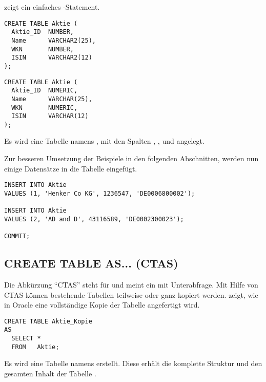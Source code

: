          zeigt ein einfaches -Statement.
        \begin{lstlisting}[language=oracle_sql,caption={Eine einfache CREATE TABLE-Anweisung in Oracle},label=sql08_02]
CREATE TABLE Aktie (
  Aktie_ID  NUMBER,
  Name      VARCHAR2(25),
  WKN       NUMBER,
  ISIN      VARCHAR2(12)
);
        \end{lstlisting}
        \begin{lstlisting}[language=ms_sql,caption={Das gleiche in MS SQL Server},label=sql08_03]
CREATE TABLE Aktie (
  Aktie_ID  NUMERIC,
  Name      VARCHAR(25),
  WKN       NUMERIC,
  ISIN      VARCHAR(12)
);
        \end{lstlisting}
        Es wird eine Tabelle namens , mit den Spalten , ,  und  angelegt.

        Zur besseren Umsetzung der Beispiele in den folgenden Abschnitten, werden nun einige Datens\"atze in die Tabelle  eingef\"ugt.
        \begin{lstlisting}[language=oracle_sql,caption={Beispieldatens\"atze},label=sql08_04]
INSERT INTO Aktie
VALUES (1, 'Henker Co KG', 1236547, 'DE0006800002');

INSERT INTO Aktie
VALUES (2, 'AD and D', 43116589, 'DE0002300023');

COMMIT;
        \end{lstlisting}
      \subsection{CREATE TABLE AS... (CTAS)}
        Die Abk\"urzung \enquote{CTAS} steht f\"ur  und meint ein  mit Unterabfrage. Mit Hilfe von CTAS k\"onnen bestehende Tabellen teilweise oder ganz kopiert werden.  zeigt, wie in Oracle eine vollst\"andige Kopie der Tabelle  angefertigt wird.
        \begin{lstlisting}[language=oracle_sql,caption={Oracle - CREATE TABLE AS (CTAS)},label=sql08_05]
CREATE TABLE Aktie_Kopie
AS
  SELECT *
  FROM   Aktie;
        \end{lstlisting}
          Es wird eine Tabelle namens  erstellt. Diese erh\"alt die komplette Struktur und den gesamten Inhalt der Tabelle .


